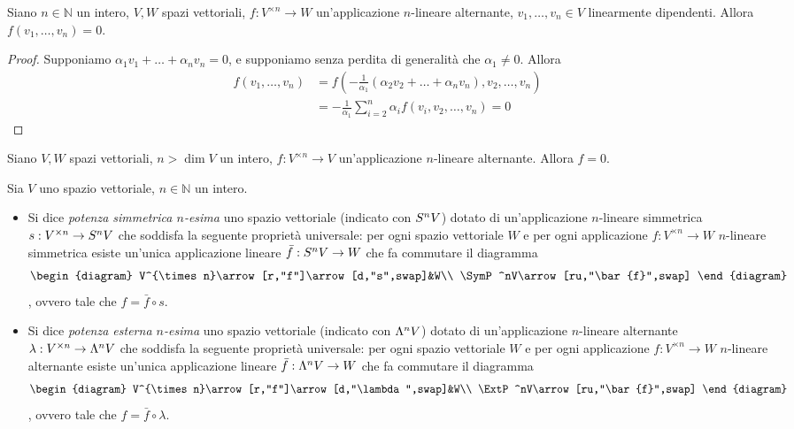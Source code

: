\begin{proposition}
Siano $n\in\mathbb{N}$ un intero, $V\comma W$ spazi vettoriali, $f:V^{\times n}\to W$ un'applicazione $n$-lineare alternante, $v_1,\ldots,v_n\in V$ linearmente dipendenti. Allora $f(v_1,\ldots,v_n)=0$.
\end{proposition}
\begin{proof}
Supponiamo $\alpha_1v_1+\ldots+\alpha_nv_n=0$, e supponiamo senza perdita di generalità che $\alpha_1\neq 0$. Allora
\begin{align*}
f(v_1,\ldots,v_n)&=f\left(-\frac{1}{\alpha_1}(\alpha_2v_2+\ldots+\alpha_nv_n),v_2,\ldots,v_n\right)\\
&=-\frac{1}{\alpha_1}\sum_{i=2}^{n}\alpha_if(v_i,v_2,\ldots,v_n)=0
\end{align*}
\end{proof}

\begin{corollary}
Siano $V\comma W$ spazi vettoriali, $n>\dim V$ un intero, $f:V^{\times n}\to V$ un'applicazione $n$-lineare alternante. Allora $f=0$.
\end{corollary}

\begin{definition}
Sia $V$ uno spazio vettoriale, $n\in\mathbb{N}$ un intero.
\begin{itemize}
\item Si dice \emph{potenza simmetrica $n$-esima} uno spazio vettoriale (indicato con $S^nV$) dotato di un'applicazione $n$-lineare simmetrica $s:V^{\times n}\to S^nV$ che soddisfa la seguente proprietà universale: per ogni spazio vettoriale $W$ e per ogni applicazione $f:V^{\times n}\to W$ $n$-lineare simmetrica esiste un'unica applicazione lineare $\bar{f}:S^nV\to W$ che fa commutare il diagramma
$$
\begin{diagram}
V^{\times n}\arrow[r,"f"]\arrow[d,"s",swap]&W\\
\SymP^nV\arrow[ru,"\bar{f}",swap]
\end{diagram}
$$
, ovvero tale che $f=\bar{f}\circ s$.
\item Si dice \emph{potenza esterna $n$-esima} uno spazio vettoriale (indicato con $\Lambda^nV$) dotato di un'applicazione $n$-lineare alternante $\lambda:V^{\times n}\to\Lambda^nV$ che soddisfa la seguente proprietà universale: per ogni spazio vettoriale $W$ e per ogni applicazione $f:V^{\times n}\to W$ $n$-lineare alternante esiste un'unica applicazione lineare $\bar{f}:\Lambda^nV\to W$ che fa commutare il diagramma
$$
\begin{diagram}
V^{\times n}\arrow[r,"f"]\arrow[d,"\lambda",swap]&W\\
\ExtP^nV\arrow[ru,"\bar{f}",swap]
\end{diagram}
$$
, ovvero tale che $f=\bar{f}\circ \lambda$.
\end{itemize}
\end{definition}

